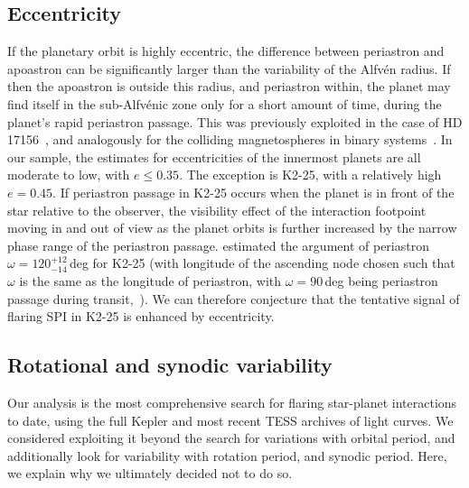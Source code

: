 \documentclass[twocolumn]{aastex631}
\begin{document}
\subsection{Eccentricity}
\label{sec:discussion:eccentricity}
If the planetary orbit is highly eccentric, the difference between periastron and apoastron can be significantly larger than the variability of the Alfv\'en radius. If then the apoastron is outside this radius, and periastron within, the planet may find itself in the sub-Alfv\'enic zone only for a short amount of time, during the planet's rapid periastron passage. This was previously exploited in the case of HD 17156~\citep{maggio2015coordinated}, and analogously for the colliding magnetospheres in binary systems~\citep{massi2002periodic,getman2016search}. In our sample, the estimates for eccentricities of the innermost planets are all moderate to low, with $e\leq 0.35$. The exception is K2-25, with a relatively high $e=0.45$. If periastron passage in K2-25 occurs when the planet is in front of the star relative to the observer, the visibility effect of the interaction footpoint moving in and out of view as the planet orbits is further increased by the narrow phase range of the periastron passage. \citet{stefansson2020habitable} estimated the argument of periastron $\omega=120^{+12}_{-14}\,$deg for K2-25 (with longitude of the ascending node chosen such that $\omega$ is the same as the longitude of periastron, with $\omega=90\,$deg being periastron passage during transit,~\citealt{kipping2010investigations,dawson2012photoeccentric}). We can therefore conjecture that the tentative signal of flaring SPI in K2-25 is enhanced by eccentricity.

\subsection{Rotational and synodic variability}
\label{sec:discussion:rotsyn}
Our analysis is the most comprehensive search for flaring star-planet interactions to date, using the full Kepler and most recent TESS archives of light curves. We considered exploiting it beyond the search for variations with orbital period, and additionally look for variability with rotation period, and synodic period. Here, we explain why we ultimately decided not to do so.
\end{document}
